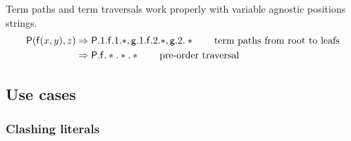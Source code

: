 \begin{example}
	Term paths and term traversals work properly with
	variable agnostic positions strings.
	\begin{align*}
		\mathsf{P}(\mathsf{f}(x,y),z)
		&\Rightarrow
		\mathsf{P}.1.\mathsf{f}.1.*, \mathsf{g}.1.\mathsf{f}.2.*, \mathsf{g}.2.*
		\tag*{term paths from root to leafs}
		\\
		&\Rightarrow \mathsf{P}.\mathsf{f}.*.*.*
		\tag*{pre-order traversal}
	\end{align*}
\end{example}

\subsection{Use cases}

\subsubsection{Clashing literals}

